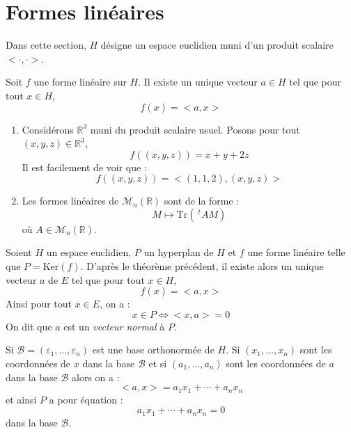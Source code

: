 \documentclass[french,11pt,twoside]{VcCours}
\begin{document}
\section{Formes linéaires}
Dans cette section, $H$ désigne un espace euclidien muni d'un produit scalaire $< \cdot, \cdot>$.

\begin{Theoreme}{} Soit $f$ une forme linéaire sur $H$. Il existe un unique vecteur $a \in H$ tel que pour tout $x \in H$,
$$ f(x)= <a,x>$$
\end{Theoreme}

\begin{Demonstration}{}
\vspace{4cm}


\end{Demonstration}

\begin{Exemples}{}
\begin{enumerate}
\item Considérons $\mathbb{R}^3$ muni du produit scalaire usuel. Posons pour tout $(x,y,z) \in \mathbb{R}^3$,
$$ f((x,y,z)) = x+y+2z $$
Il est facilement de voir que :
$$ f((x,y,z)) = <(1,1,2), (x,y,z)>$$
\item Les formes linéaires de $\mathcal{M}_n(\mathbb{R})$ sont de la forme :
$$ M \mapsto \textrm{Tr}(~^tA M) $$
où $A \in \mathcal{M}_n(\mathbb{R})$.
\end{enumerate}
\end{Exemples}

\begin{Definition}{} Soient $H$ un espace euclidien, $P$ un hyperplan de $H$ et $f$ une forme linéaire telle que $P = \textrm{Ker}(f)$. D'après le théorème précédent, il existe alors un unique vecteur $a$ de $E$ tel que pour tout $x \in H$, 
$$ f(x) = <a,x>$$
Ainsi pour tout $x \in E$, on a :
$$ x \in P \Longleftrightarrow <x,a>= 0$$
On dit que $a$ est un \emph{vecteur normal} à $P$.

Si $\mathcal{B}=(\varepsilon_1, \ldots, \varepsilon_n)$ est une base orthonormée de $H$. Si $(x_1, \ldots, x_n)$ sont les coordonnées de $x$ dans la base $\mathcal{B}$ et si $(a_1, \ldots, a_n)$ sont les coordonnées de $a$ dans la base $\mathcal{B}$ alors on a :
$$ <a,x> = a_1 x_1 + \cdots + a_n x_n $$
et ainsi $P$ a pour équation :
$$ a_1 x_1 + \cdots + a_n x_n = 0$$
dans la base $\mathcal{B}$. 
\end{Definition}
\end{document}
